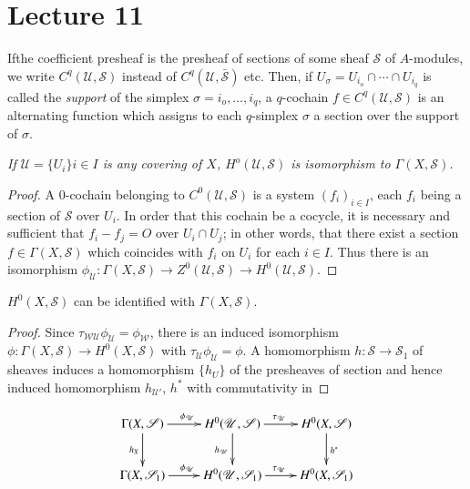 \chapter{Lecture 11}\label{chap11:lec11}

If\pageoriginale the coefficient presheaf is the presheaf of sections
of some sheaf 
$\mathscr{S}$ of $A$-modules, we write $C^q(\mathscr{U},\mathscr{S})$
instead of $C^q(\mathscr{U}, \bar{\mathscr{S}})$ etc. Then, if
$U_\sigma =U _{i_o} \cap \cdots \cap U_{i_q}$ is called the \textit{
  support} of the simplex $\sigma= i_o, \ldots ,i_q$, a $q$-cochain $f
\in C^q (\mathscr{U},\mathscr{S})$ is an alternating function which
assigns to each $q$-simplex $\sigma$ a section over the support of
$\sigma$. 

\textit{If $\mathscr{U}=\{ U_i \} i\in I$  is any covering
  of $X$, $H^o(\mathscr{U},\mathscr{S})$ is isomorphism to
$\Gamma (X,\mathscr{S})$.}
 
\begin{proof}
A $0$-cochain belonging to $C^0(\mathscr{U},\mathscr{S})$ is a system
$(f_i)_{i \in I}$, each $f_i$ being a section of $\mathscr{S}$ over
$U_i$. In order that this cochain be a cocycle, it is necessary and
sufficient that $f_i-f_j=O$ over $U_i \cap U_{j}$; in other words,
that there exist a section $f \in \Gamma (X, \mathscr{S})$ which
coincides with $f_i$ on $U_i$ for each $i \in I$. Thus there is an
isomorphism $\phi _\mathscr{U}:\Gamma (X, \mathscr{S})\to
Z^0(\mathscr{U},\mathscr{S}) \to H^0 (\mathscr{U},\mathscr{S})$. 
\end{proof}

\begin{proposition}\label{chap11:prop7} %
$H^0 (X,\mathscr{S})$ can be identified with $\Gamma (X,
    \mathscr{S})$. 
\end{proposition}

\begin{proof}
Since $\tau_{\mathscr{W}\mathscr{U}} \phi _\mathscr{U} =\phi
_\mathscr{W}$, there is an induced isomorphism $\phi: \Gamma (X,
\mathscr{S}) \to H^0 (X, \mathscr{S})$ with $\tau_{\mathscr{U}}
\phi_{\mathscr{U}} = \phi$. A homomorphism  
$h: \mathscr{S} \to \mathscr{S}_1$ of sheaves induces a homomorphism
$\{ h_U \}$ of the presheaves of section and hence induced homomorphism
$h_{\mathscr{U}'}$, $h^*$ with commutativity in  
\end{proof}
\[
\xymatrix{
\Gamma(X,\mathscr{S}) \ar[r]^{\phi_{\mathscr{U}}} \ar[d]_{h_X} &
H^0(\mathscr{U},\mathscr{S}) \ar[r]^{\tau_{\mathscr{U}}}
\ar[d]_{h_{\mathscr{U}}} & H^0(X,\mathscr{S})\ar[d]^{h^{\ast}}\\
\Gamma(X,\mathscr{S}_1) \ar[r]^{\phi_{\mathscr{U}}} &
H^0(\mathscr{U},\mathscr{S}_1) \ar[r]^{\tau_{\mathscr{U}}}  &
H^0(X,\mathscr{S}_1) 
}
\]

